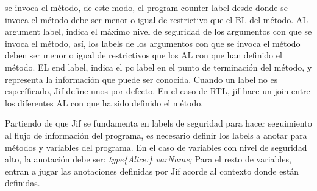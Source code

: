 se invoca el método, de este modo, el program counter label desde donde
se invoca el método debe ser menor o igual de restrictivo que el BL del
método.\newline 
AL argument label, indica el máximo nivel de seguridad de los argumentos con que
se invoca el método, así, los labels de los argumentos con que se invoca el
método deben ser menor o igual de restrictivos que los AL con que han
definido el método.\newline
EL end label, indica el pc label en el punto de terminación del método, y
representa la información que puede ser conocida.\newline
Cuando un label no es específicado, Jif define unos por defecto. En el caso de
RTL, jif hace un join entre los diferentes AL con que ha sido definido el
método.\newline

Partiendo de que Jif se fundamenta en labels de seguridad para hacer seguimiento
al flujo de información del programa, es necesario definir los labels a
anotar para métodos y variables del programa.\newline
En el caso de variables con nivel de seguridad  alto, la anotación debe
ser:\newline
\emph{ type\{Alice:\} varName; }\newline
Para el resto de variables, entran a jugar las anotaciones definidas por Jif
acorde al contexto donde están definidas.

